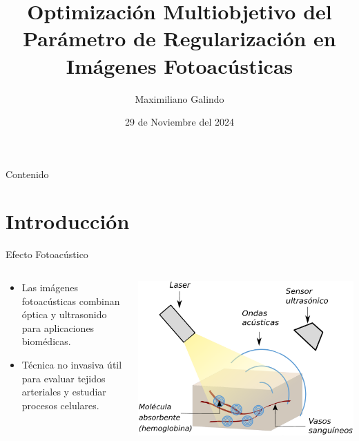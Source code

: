 \documentclass[aspectratio=169,xcolor=dvipsnames]{beamer}
\title[short title]{Optimización Multiobjetivo del Parámetro de Regularización en Imágenes Fotoacústicas}
\author[Pin-Yen] {Maximiliano Galindo}
\institute[UNAM] %
{
    Maestría en Ciencia e Ingeniería de la Computación  \\
    Universidad Nacional Autónoma de México
    \vskip 3pt
    \textbf{Supervisores:} \\
    Dr. Luis Agustín Alvarez-Icaza Longoria \\
    Dr. Roberto Giovanni Ramírez Chavarría \\
}
\date{29 de Noviembre del 2024} %
\begin{document}
\begin{frame}
    \titlepage
\end{frame}

\begin{frame}{Contenido}
    \tableofcontents
\end{frame}

\section{Introducción}

\begin{frame}{Efecto Fotoacústico}
    \begin{columns}
        \begin{column}{0.5\textwidth}
            \begin{itemize}
                \item Las imágenes fotoacústicas combinan óptica y ultrasonido para aplicaciones biomédicas.
                \item Técnica no invasiva útil para evaluar tejidos arteriales y estudiar procesos celulares.
            \end{itemize}
        \end{column}
        \begin{column}{0.5\textwidth}
            \centering
            \includegraphics[width=\textwidth]{img/effect.pdf} %
        \end{column}
    \end{columns}
\end{frame}
\end{document}
